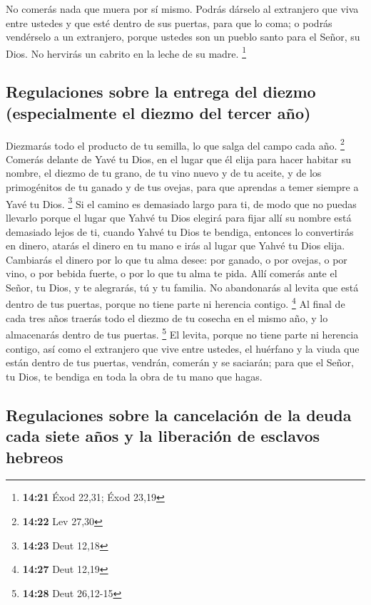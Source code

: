  No comerás nada que muera por sí mismo. Podrás dárselo
al extranjero que viva entre ustedes y que esté dentro de sus puertas,
para que lo coma; o podrás vendérselo a un extranjero, porque ustedes
son un pueblo santo para el Señor, su Dios. No hervirás un cabrito en la
leche de su madre. \footnote{\textbf{14:21} Éxod 22,31; Éxod 23,19}

\hypertarget{regulaciones-sobre-la-entrega-del-diezmo-especialmente-el-diezmo-del-tercer-auxf1o}{%
\subsection{Regulaciones sobre la entrega del diezmo (especialmente el
diezmo del tercer
año)}\label{regulaciones-sobre-la-entrega-del-diezmo-especialmente-el-diezmo-del-tercer-auxf1o}}

 Diezmarás todo el producto de tu semilla, lo que salga
del campo cada año. \footnote{\textbf{14:22} Lev 27,30} 
Comerás delante de Yavé tu Dios, en el lugar que él elija para hacer
habitar su nombre, el diezmo de tu grano, de tu vino nuevo y de tu
aceite, y de los primogénitos de tu ganado y de tus ovejas, para que
aprendas a temer siempre a Yavé tu Dios. \footnote{\textbf{14:23} Deut
  12,18}  Si el camino es demasiado largo para ti, de
modo que no puedas llevarlo porque el lugar que Yahvé tu Dios elegirá
para fijar allí su nombre está demasiado lejos de ti, cuando Yahvé tu
Dios te bendiga,  entonces lo convertirás en dinero,
atarás el dinero en tu mano e irás al lugar que Yahvé tu Dios elija.
 Cambiarás el dinero por lo que tu alma desee: por
ganado, o por ovejas, o por vino, o por bebida fuerte, o por lo que tu
alma te pida. Allí comerás ante el Señor, tu Dios, y te alegrarás, tú y
tu familia.  No abandonarás al levita que está dentro de
tus puertas, porque no tiene parte ni herencia contigo. \footnote{\textbf{14:27}
  Deut 12,19}  Al final de cada tres años traerás todo el
diezmo de tu cosecha en el mismo año, y lo almacenarás dentro de tus
puertas. \footnote{\textbf{14:28} Deut 26,12-15}  El
levita, porque no tiene parte ni herencia contigo, así como el
extranjero que vive entre ustedes, el huérfano y la viuda que están
dentro de tus puertas, vendrán, comerán y se saciarán; para que el
Señor, tu Dios, te bendiga en toda la obra de tu mano que hagas.

\hypertarget{regulaciones-sobre-la-cancelaciuxf3n-de-la-deuda-cada-siete-auxf1os-y-la-liberaciuxf3n-de-esclavos-hebreos}{%
\subsection{Regulaciones sobre la cancelación de la deuda cada siete
años y la liberación de esclavos
hebreos}\label{regulaciones-sobre-la-cancelaciuxf3n-de-la-deuda-cada-siete-auxf1os-y-la-liberaciuxf3n-de-esclavos-hebreos}}

